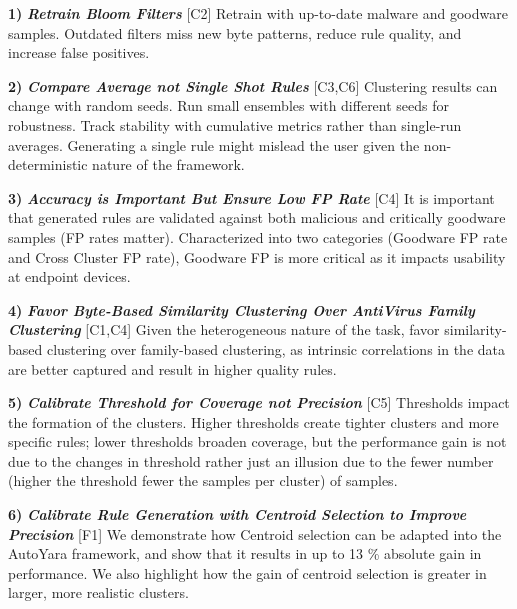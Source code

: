\noindent \textbf{1)} \textbf{\textit{Retrain Bloom Filters}} [C2]
\newline
Retrain with up-to-date malware and goodware samples. Outdated filters miss new byte patterns, reduce rule quality, and increase false positives.

\noindent \textbf{2)} \textbf{\textit{Compare Average not Single Shot Rules}} [C3,C6]
\newline
Clustering results can change with random seeds. Run small ensembles with different seeds for robustness. Track stability with cumulative metrics rather than single-run averages. Generating a single rule might mislead the user given the non-deterministic nature of the framework.

\noindent \textbf{3)} \textbf{\textit{Accuracy is Important But Ensure Low FP Rate}} [C4]
\newline
It is important that generated rules are validated against both malicious and critically goodware samples (FP rates matter). Characterized into two categories (Goodware FP rate and Cross Cluster FP rate), Goodware FP is more critical as it impacts usability at endpoint devices.

\noindent \textbf{4)}  \textbf{\textit{Favor Byte-Based Similarity Clustering Over AntiVirus Family Clustering}} [C1,C4]
\newline
Given the heterogeneous nature of the task, favor similarity-based clustering over family-based clustering, as intrinsic correlations in the data are better captured and result in higher quality rules. 

\noindent \textbf{5)} \textbf{\textit{Calibrate Threshold for Coverage not Precision}} [C5]
\newline
Thresholds impact the formation of the clusters. Higher thresholds create tighter clusters and more specific rules; lower thresholds broaden coverage, but the performance gain is not due to the changes in threshold rather just an illusion due to the fewer number (higher the threshold fewer the samples per cluster) of samples. 

\noindent \textbf{6)}  \textbf{\textit{Calibrate Rule Generation with Centroid Selection to Improve Precision}} [F1]
\newline
We demonstrate how Centroid selection can be adapted into the AutoYara framework, and show that it results in up to 13 \% absolute gain in performance. We also highlight how the gain of centroid selection is greater in larger, more realistic clusters.  

